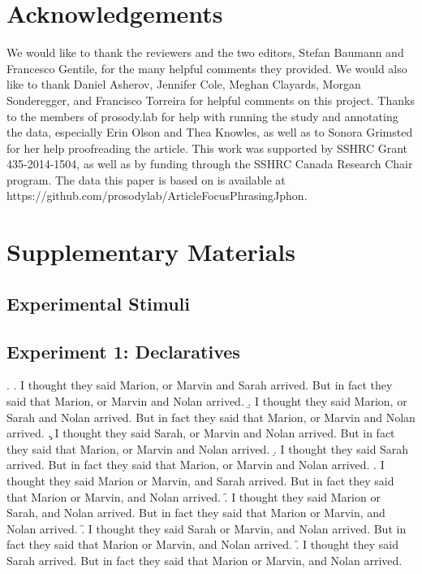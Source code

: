 \documentclass[preprint,review,12pt,authoryear,times]{elsarticle}
\begin{document}
\section*{Acknowledgements}

We would like to thank the reviewers and the two editors, Stefan Baumann and Francesco Gentile, for the many helpful comments they provided. We  would also like to thank Daniel Asherov, Jennifer Cole, Meghan Clayards, Morgan Sonderegger, and Francisco Torreira for helpful comments on this project. Thanks to the members of prosody.lab for help with running the study and annotating the data, especially Erin Olson and Thea Knowles, as well as to Sonora Grimsted for her help proofreading the article. This work was supported by SSHRC Grant 435-2014-1504, as well as by funding through the SSHRC Canada Research Chair program. The data this paper is based on is available at https://github.com/prosodylab/ArticleFocusPhrasingJphon.


\newpage



\newpage

\section*{Supplementary Materials}

\subsection{Experimental Stimuli}

\setcounter{ExNo}{0}

\subsection*{Experiment 1: Declaratives}

\ex. 
\a. I thought they said Marion, or Marvin and Sarah arrived. But in fact they said that Marion, or Marvin and Nolan arrived.
\b. I thought they said Marion, or Sarah and Nolan arrived. But in fact they said that Marion, or Marvin and Nolan arrived.
\c. I thought they said Sarah, or Marvin and Nolan arrived. But in fact they said that Marion, or Marvin and Nolan arrived.
\d. I thought they said Sarah arrived. But in fact they said that Marion, or Marvin and Nolan arrived.
\e. I thought they said Marion or Marvin, and Sarah arrived. But in fact they said that Marion or Marvin, and Nolan arrived.
\f. I thought they said Marion or Sarah, and Nolan arrived. But in fact they said that Marion or Marvin, and Nolan arrived.
\f. I thought they said Sarah or Marvin, and Nolan arrived. But in fact they said that Marion or Marvin, and Nolan arrived.
\f. I thought they said Sarah arrived. But in fact they said that Marion or Marvin, and Nolan arrived.
\end{document}
